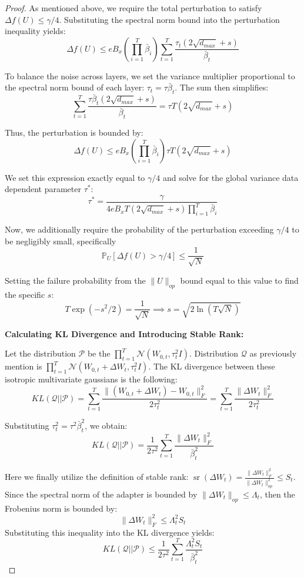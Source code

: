 \documentclass[a4paper,14pt]{extarticle}
\DeclareMathOperator{\sr}{sr}
\begin{document}
\begin{proof}
        As mentioned above, we require the total perturbation to satisfy $\Delta f(U) \leqslant \gamma / 4$. Substituting the spectral norm bound into the perturbation inequality yields:
        $$ \Delta f(U) \leqslant e B_x \left( \prod_{i=1}^T \bar{\beta}_i \right) \sum_{t=1}^T \frac{\tau_t (2\sqrt{d_{max}} + s)}{\bar{\beta}_t} $$

        To balance the noise across layers, we set the variance multiplier proportional to the spectral norm bound of each layer: $\tau_t = \tau \bar{\beta}_t$. The sum then simplifies:
        $$ \sum_{t=1}^T \frac{\tau \bar{\beta}_t (2\sqrt{d_{max}} + s)}{\bar{\beta}_t} = \tau T (2\sqrt{d_{max}} + s) $$

        Thus, the perturbation is bounded by:
        $$ \Delta f(U) \leqslant e B_x \left( \prod_{i=1}^T \bar{\beta}_i \right) \tau T (2\sqrt{d_{max}} + s) $$

        We set this expression exactly equal to $\gamma / 4$ and solve for the global variance data dependent parameter $\tau^*$:
        $$ \tau^* = \frac{\gamma}{4 e B_x T (2\sqrt{d_{max}} + s) \prod_{i=1}^T \bar{\beta}_i} $$

        Now, we additionally require the probability of the perturbation exceeding $\gamma/4$ to be negligibly small, specifically 
        $$\mathbb{P}_U[\Delta f(U) > \gamma/4] \leqslant \frac{1}{\sqrt{N}}$$ 
        
        Setting the failure probability from the $\|U\|_{op}$ bound equal to this value to find the specific $s$:
        $$ T\exp(-s^2/2) = \frac{1}{\sqrt{N}} \implies s = \sqrt{2 \ln(T \sqrt{N})} $$


        \textbf{Calculating KL Divergence and Introducing Stable Rank:} 

        Let the distribution $\mathcal{P}$ be the $\prod_{t=1}^T \mathcal{N}(W_{0,t}, \tau_t^2 I)$. Distribution $\mathcal{Q}$ as previously mention is $\prod_{t=1}^T \mathcal{N}(W_{0,t} + \Delta W_t, \tau_t^2 I)$. The KL divergence between these isotropic multivariate gaussians is the following:
        $$ KL(\mathcal{Q} || \mathcal{P}) = \sum_{t=1}^T \frac{\|(W_{0,t} + \Delta W_t) - W_{0,t}\|_F^2}{2\tau_t^2} = \sum_{t=1}^T \frac{\|\Delta W_t\|_F^2}{2\tau_t^2} $$

        Substituting $\tau_t^2 = \tau^2 \bar{\beta}_t^2$, we obtain:
        $$ KL(\mathcal{Q} || \mathcal{P}) = \frac{1}{2\tau^2} \sum_{t=1}^T \frac{\|\Delta W_t\|_F^2}{\bar{\beta}_t^2} $$

        Here we finally utilize the definition of stable rank: $\sr(\Delta W_t) = \frac{\|\Delta W_t\|_F^2}{\|\Delta W_t\|_{op}^2} \leqslant S_t$. Since the spectral norm of the adapter is bounded by $\|\Delta W_t\|_{op} \leqslant \Lambda_t$, then the Frobenius norm is bounded by:
        $$ \|\Delta W_t\|_F^2 \leqslant \Lambda_t^2 S_t $$
        Substituting this inequality into the KL divergence yields:
        $$ KL(\mathcal{Q} || \mathcal{P}) \leqslant \frac{1}{2\tau^2} \sum_{t=1}^T \frac{\Lambda_t^2 S_t}{\bar{\beta}_t^2} $$



\end{proof}
\end{document}
